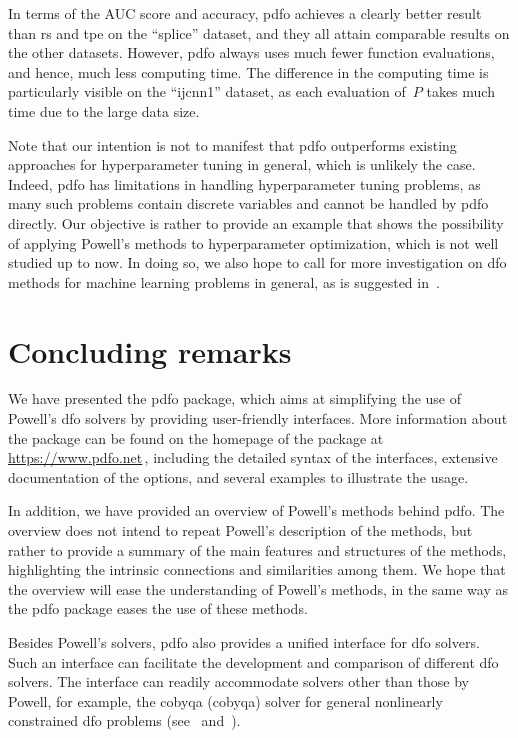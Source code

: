 \documentclass{article}
\numberwithin{equation}{section}
\theoremstyle{definition}
\theoremstyle{plain}
\theoremstyle{remark}
\begin{document}
In terms of the AUC score and accuracy, \gls{pdfo} achieves a clearly better result than \gls{rs} and \gls{tpe} on the ``splice'' dataset, and they all attain comparable results on the other datasets.
However, \gls{pdfo} always uses much fewer function evaluations, and hence, much less computing time.
The difference in the computing time is particularly visible on the ``ijcnn1'' dataset, as each evaluation of~$P$ takes much time due to the large data size.

Note that our intention is not to manifest that \gls{pdfo} outperforms existing approaches for hyperparameter tuning in general, which is unlikely the case.
Indeed, \gls{pdfo} has limitations in handling hyperparameter tuning problems, as many such problems contain discrete variables and cannot be handled by \gls{pdfo} directly.
Our objective is rather to provide an example that shows the possibility of applying Powell's methods to hyperparameter optimization, which is not well studied up to now.
In doing so, we also hope to call for more investigation on \gls{dfo} methods for machine learning problems in general, as is suggested in~\cite{Ghanbari_Scheinberg_2017}.

\section{Concluding remarks}
\label{sec:conclude}

We have presented the \gls{pdfo} package, which aims at simplifying the use of Powell's \gls{dfo} solvers by providing user-friendly interfaces.
More information about the package can be found on the homepage of the package at \url{https://www.pdfo.net}\,, including the detailed syntax of the interfaces, extensive documentation of the options, and several examples to illustrate the usage.

In addition, we have provided an overview of Powell's methods behind \gls{pdfo}.
The overview does not intend to repeat Powell's description of the methods, but rather to provide a summary of the main features and structures of the methods, highlighting the intrinsic connections and similarities among them.
We hope that the overview will ease the understanding of Powell's methods, in the same way as the \gls{pdfo} package eases the use of these methods.

Besides Powell's solvers, \gls{pdfo} also provides a unified interface for \gls{dfo} solvers.
Such an interface can facilitate the development and comparison of different \gls{dfo} solvers.
The interface can readily accommodate solvers other than those by Powell, for example, the \gls{cobyqa} (\glsdesc{cobyqa}) solver for general nonlinearly constrained \gls{dfo} problems (see~\cite[Chapters~5--7]{Ragonneau_2022} and~\cite{Ragonneau_Zhang_cobyqa}).
\end{document}
